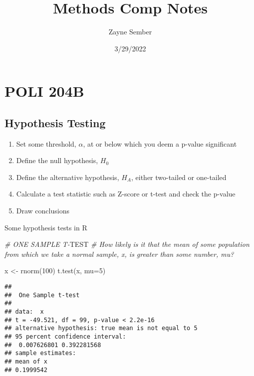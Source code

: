 \documentclass[
]{article}
\title{Methods Comp Notes}
\author{Zayne Sember}
\date{3/29/2022}
\newenvironment{Shaded}{\begin{snugshade}}{\end{snugshade}}
\newcommand{\AlertTok}[1]{\textcolor[rgb]{0.94,0.16,0.16}{#1}}
\newcommand{\AttributeTok}[1]{\textcolor[rgb]{0.77,0.63,0.00}{#1}}
\newcommand{\CommentTok}[1]{\textcolor[rgb]{0.56,0.35,0.01}{\textit{#1}}}
\newcommand{\DecValTok}[1]{\textcolor[rgb]{0.00,0.00,0.81}{#1}}
\newcommand{\FunctionTok}[1]{\textcolor[rgb]{0.00,0.00,0.00}{#1}}
\newcommand{\NormalTok}[1]{#1}
\newcommand{\OtherTok}[1]{\textcolor[rgb]{0.56,0.35,0.01}{#1}}
\begin{document}
\maketitle

\hypertarget{poli-204b}{%
\section{POLI 204B}\label{poli-204b}}

\hypertarget{hypothesis-testing}{%
\subsection{Hypothesis Testing}\label{hypothesis-testing}}

\begin{enumerate}
\def\labelenumi{\arabic{enumi}.}
\item
  Set some threshold, \(\alpha\), at or below which you deem a p-value
  significant
\item
  Define the null hypothesis, \(H_0\)
\item
  Define the alternative hypothesis, \(H_A\), either two-tailed or
  one-tailed
\item
  Calculate a test statistic such as Z-score or t-test and check the
  p-value
\item
  Draw conclusions
\end{enumerate}

Some hypothesis tests in R

\begin{Shaded}
\begin{Highlighting}[]
\CommentTok{\# ONE SAMPLE T{-}}\AlertTok{TEST}
\CommentTok{\# How likely is it that the mean of some population from which we take a normal sample, x, is greater than some number, mu?}

\NormalTok{x }\OtherTok{\textless{}{-}} \FunctionTok{rnorm}\NormalTok{(}\DecValTok{100}\NormalTok{)}
\FunctionTok{t.test}\NormalTok{(x, }\AttributeTok{mu=}\DecValTok{5}\NormalTok{)}
\end{Highlighting}
\end{Shaded}

\begin{verbatim}
## 
##  One Sample t-test
## 
## data:  x
## t = -49.521, df = 99, p-value < 2.2e-16
## alternative hypothesis: true mean is not equal to 5
## 95 percent confidence interval:
##  0.007626801 0.392281568
## sample estimates:
## mean of x 
## 0.1999542
\end{verbatim}
\end{document}
